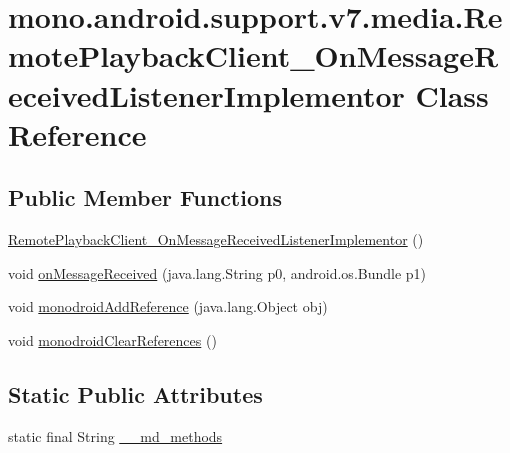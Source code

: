 \hypertarget{classmono_1_1android_1_1support_1_1v7_1_1media_1_1_remote_playback_client___on_message_received_listener_implementor}{
\section{mono.android.support.v7.media.RemotePlaybackClient\_\-OnMessageReceivedListenerImplementor Class Reference}
\label{classmono_1_1android_1_1support_1_1v7_1_1media_1_1_remote_playback_client___on_message_received_listener_implementor}
}
\subsection*{Public Member Functions}
\begin{CompactItemize}
\item 
\hyperlink{classmono_1_1android_1_1support_1_1v7_1_1media_1_1_remote_playback_client___on_message_received_listener_implementor_022fca6ccb3bd609298df8dba53c100b}{RemotePlaybackClient\_\-OnMessageReceivedListenerImplementor} ()
\item 
void \hyperlink{classmono_1_1android_1_1support_1_1v7_1_1media_1_1_remote_playback_client___on_message_received_listener_implementor_fd8e4d54492afc49fc49d7cf64834110}{onMessageReceived} (java.lang.String p0, android.os.Bundle p1)
\item 
void \hyperlink{classmono_1_1android_1_1support_1_1v7_1_1media_1_1_remote_playback_client___on_message_received_listener_implementor_ef2664f4c8c664fb805d7d2da12e9f2e}{monodroidAddReference} (java.lang.Object obj)
\item 
void \hyperlink{classmono_1_1android_1_1support_1_1v7_1_1media_1_1_remote_playback_client___on_message_received_listener_implementor_021f477b112e12fc48db395502bf0979}{monodroidClearReferences} ()
\end{CompactItemize}
\subsection*{Static Public Attributes}
\begin{CompactItemize}
\item 
static final String \hyperlink{classmono_1_1android_1_1support_1_1v7_1_1media_1_1_remote_playback_client___on_message_received_listener_implementor_2b297de4e6a4fb110d08640626cc62e1}{\_\-\_\-md\_\-methods}
\end{CompactItemize}
